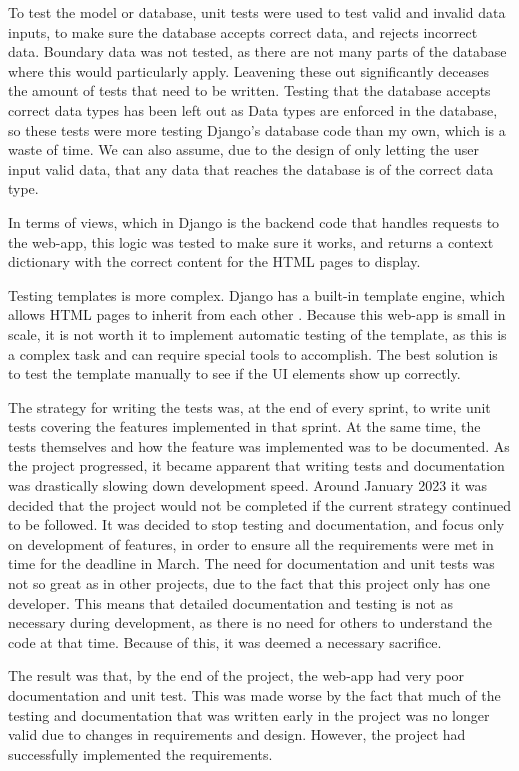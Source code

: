 \documentclass{l4proj}
\begin{document}
To test the model or database, unit tests were used to test valid and invalid data inputs, to make sure the database accepts correct data, and rejects incorrect data. Boundary data was not tested, as there are not many parts of the database where this would particularly apply. Leavening these out significantly deceases the amount of tests that need to be written. Testing that the database accepts correct data types has been left out as Data types are enforced in the database, so these tests were more testing Django's database code than my own, which is a waste of time. We can also assume, due to the design of only letting the user input valid data, that any data that reaches the database is of the correct data type.


In terms of views, which in Django is the backend code that handles requests to the web-app, this logic was tested to make sure it works, and returns a context dictionary with the correct content for the HTML pages to display.

Testing templates is more complex. Django has a built-in template engine, which allows HTML pages to inherit from each other \citep{django}. Because this web-app is small in scale, it is not worth it to implement automatic testing of the template, as this is a complex task and can require special tools to accomplish. The best solution is to test the template manually to see if the UI elements show up correctly.

The strategy for writing the tests was, at the end of every sprint, to write unit tests covering the features implemented in that sprint. At the same time, the tests themselves and how the feature was implemented was to be documented. As the project progressed, it became apparent that writing tests and documentation was drastically slowing down development speed. Around January 2023 it was decided that the project would not be completed if the current strategy continued to be followed. It was decided to stop testing and documentation, and focus only on development of features, in order to ensure all the requirements were met in time for the deadline in March. The need for documentation and unit tests was not so great as in other projects, due to the fact that this project only has one developer. This means that detailed documentation and testing is not as necessary during development, as there is no need for others to understand the code at that time. Because of this, it was deemed a necessary sacrifice.

The result was that, by the end of the project, the web-app had very poor documentation and unit test. This was made worse by the fact that much of the testing and documentation that was written early in the project was no longer valid due to changes in requirements and design. However, the project had successfully implemented the requirements.
\end{document}
